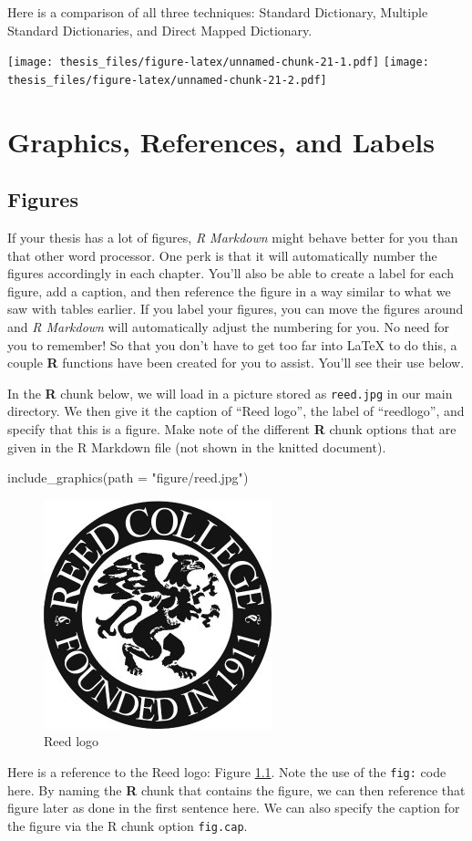 \documentclass[12pt,twoside]{reedthesis}
\newenvironment{Shaded}{\begin{snugshade}}{\end{snugshade}}
\newcommand{\AttributeTok}[1]{\textcolor[rgb]{0.77,0.63,0.00}{#1}}
\newcommand{\FunctionTok}[1]{\textcolor[rgb]{0.00,0.00,0.00}{#1}}
\newcommand{\NormalTok}[1]{#1}
\newcommand{\StringTok}[1]{\textcolor[rgb]{0.31,0.60,0.02}{#1}}
\begin{document}
Here is a comparison of all three techniques: Standard Dictionary, Multiple Standard Dictionaries, and Direct Mapped Dictionary.

\texttt{[image: thesis\_files/figure-latex/unnamed-chunk-21-1.pdf]} \texttt{[image: thesis\_files/figure-latex/unnamed-chunk-21-2.pdf]}

\hypertarget{ref-labels}{%
\chapter{Graphics, References, and Labels}\label{ref-labels}}

\hypertarget{figures}{%
\section{Figures}\label{figures}}

If your thesis has a lot of figures, \emph{R Markdown} might behave better for you than that other word processor. One perk is that it will automatically number the figures accordingly in each chapter. You'll also be able to create a label for each figure, add a caption, and then reference the figure in a way similar to what we saw with tables earlier. If you label your figures, you can move the figures around and \emph{R Markdown} will automatically adjust the numbering for you. No need for you to remember! So that you don't have to get too far into LaTeX to do this, a couple \textbf{R} functions have been created for you to assist. You'll see their use below.

In the \textbf{R} chunk below, we will load in a picture stored as \texttt{reed.jpg} in our main directory. We then give it the caption of ``Reed logo'', the label of ``reedlogo'', and specify that this is a figure. Make note of the different \textbf{R} chunk options that are given in the R Markdown file (not shown in the knitted document).
\begin{Shaded}
\begin{Highlighting}[]
\FunctionTok{include\_graphics}\NormalTok{(}\AttributeTok{path =} \StringTok{"figure/reed.jpg"}\NormalTok{)}
\end{Highlighting}
\end{Shaded}
\begin{figure}

{\centering \includegraphics[width=0.2\linewidth]{figure/reed} 

}

\caption{Reed logo}\label{fig:reedlogo}
\end{figure}
Here is a reference to the Reed logo: Figure \ref{fig:reedlogo}. Note the use of the \texttt{fig:} code here. By naming the \textbf{R} chunk that contains the figure, we can then reference that figure later as done in the first sentence here. We can also specify the caption for the figure via the R chunk option \texttt{fig.cap}.
\end{document}
